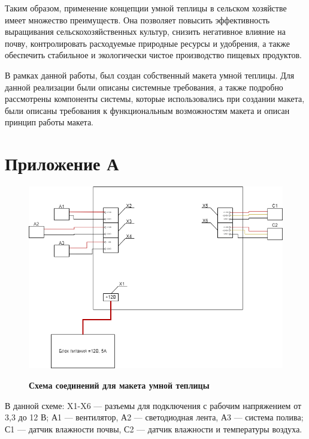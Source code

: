 \documentclass{altsu-bachelor}
\begin{document}
Таким образом, применение концепции умной теплицы в сельском хозяйстве имеет множество преимуществ. Она позволяет повысить эффективность выращивания сельскохозяйственных культур, снизить негативное влияние на почву, контролировать расходуемые природные ресурсы и удобрения, а также обеспечить стабильное и экологически чистое производство пищевых продуктов.


В рамках данной работы, был создан собственный макета умной теплицы. Для данной реализации были описаны системные требования, а также подробно рассмотрены компоненты системы, которые использовались при создании макета, были описаны требования к функциональным возможностям макета и описан принцип работы макета.

\newpage
{}
\printbibliography[title={Список литературы}]

\chapter*{Приложение А}

\begin{figure}[H]
    \centering
    \caption*{\textbf{Схема соединений для макета умной теплицы}}
    \includegraphics[scale=0.7]{images/connections_schem.png}
    \label{fig:connection_schem}
\end{figure}

В данной схеме: X1-X6 --- разъемы для подключения с рабочим напряжением от 3,3 до 12 В; А1 --- вентилятор, А2 --- светодиодная лента, А3 --- система полива; С1 --- датчик влажности почвы, С2 --- датчик влажности и температуры воздуха.
\end{document}
